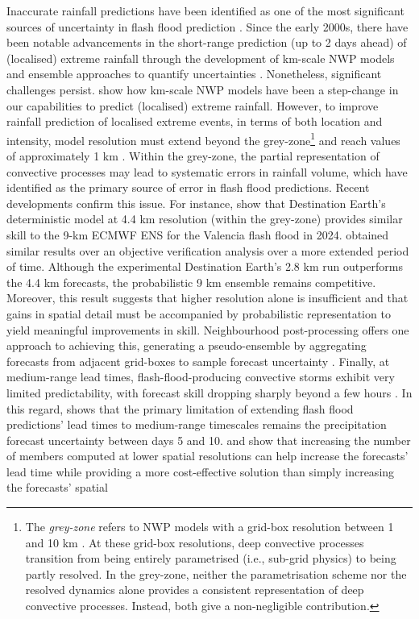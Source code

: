 Inaccurate  rainfall predictions have been identified as one of the most significant sources of uncertainty in flash flood prediction \citep{Hapuarachchi_2011, Zanchetta_2020}. Since the early 2000s, there have been notable advancements in the short-range prediction (up to 2 days ahead) of (localised) extreme rainfall through the development of km-scale NWP models and ensemble approaches to quantify uncertainties \citep{Roebber_2004}. Nonetheless, significant challenges persist. \citet{Clark_2016} show how km-scale NWP models have been a step-change in our capabilities to predict (localised) extreme rainfall. However, to improve rainfall prediction of localised extreme events, in terms of both location and intensity, model resolution must extend beyond the grey-zone\footnote{The \textit{grey-zone} refers to NWP models with a grid-box resolution between 1 and 10 km \citep{Wyngaard_2004}. At these grid-box resolutions, deep convective processes transition from being entirely parametrised (i.e., sub-grid physics) to being partly resolved. In the grey-zone, neither the parametrisation scheme nor the resolved dynamics alone provides a consistent representation of deep convective processes. Instead, both give a non-negligible contribution.} and reach values of approximately 1 km \citep{Castorina_2022}. Within the grey-zone, the partial representation of convective processes may lead to systematic errors in rainfall volume, which \citet{Sangati_2009} have identified as the primary source of error in flash flood predictions. Recent developments confirm this issue. For instance, \citet{Gascón_2025} show that Destination Earth's deterministic model at 4.4 km resolution (within the grey-zone) provides similar skill to the 9-km ECMWF ENS  for the Valencia flash flood in 2024. \citet{Hewson_2024a} obtained similar results over an objective verification analysis over a more extended period of time. Although the experimental Destination Earth's 2.8 km run outperforms the 4.4 km forecasts, the probabilistic 9 km ensemble remains competitive. Moreover, this result suggests that higher resolution alone is insufficient and that gains in spatial detail must be accompanied by probabilistic representation to yield meaningful improvements in skill. Neighbourhood post-processing offers one approach to achieving this, generating a pseudo-ensemble by aggregating forecasts from adjacent grid-boxes to sample forecast uncertainty \citep{Roberts_2023}. Finally, at medium-range lead times, flash-flood-producing convective storms exhibit very limited predictability, with forecast skill dropping sharply beyond a few hours \citep{Buizza_2015, Barrett_2019}. In this regard, \citet{Jasper_2002} shows that the primary limitation of extending flash flood predictions' lead times to medium-range timescales remains the precipitation forecast uncertainty between days 5 and 10. \citet{Schwartz_2019a} and \citet{Schwartz_2019b} show that increasing the number of members computed at lower spatial resolutions can help increase the forecasts' lead time while providing a more cost-effective solution than simply increasing the forecasts' spatial 